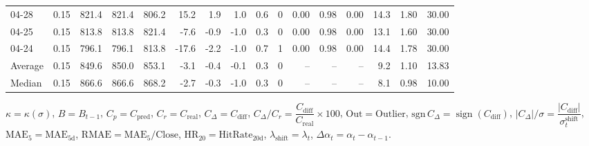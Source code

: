 \begin{threeparttable}
{\begin{tabular}{lrrrrrrrrrrrrrrr}
  04-28 &     0.15 & 821.4 & 821.4 & 806.2 &       15.2 &            1.9 &                      1.0 &                 0.6 &              0 &       0.00 &      0.98 &           0.00 &             14.3 &            1.80 &                  30.00 \\
  04-25 &     0.15 & 813.8 & 813.8 & 821.4 &       -7.6 &           -0.9 &                     -1.0 &                 0.3 &              0 &       0.00 &      0.98 &           0.00 &             13.1 &            1.60 &                  30.00 \\
  04-24 &     0.15 & 796.1 & 796.1 & 813.8 &      -17.6 &           -2.2 &                     -1.0 &                 0.7 &              1 &       0.00 &      0.98 &           0.00 &             14.4 &            1.78 &                  30.00 \\
Average &     0.15 & 849.6 & 850.0 & 853.1 &       -3.1 &           -0.4 &                     -0.1 &                 0.3 &              0 &         -- &        -- &             -- &              9.2 &            1.10 &                  13.83 \\
 Median &     0.15 & 866.6 & 866.6 & 868.2 &       -2.7 &           -0.3 &                     -1.0 &                 0.3 &              0 &         -- &        -- &             -- &              8.1 &            0.98 &                  10.00 \\
\bottomrule
\end{tabular}
}
\begin{tablenotes}\footnotesize
\item $\kappa=\kappa(\sigma)$, $B=B_{t-1}$, $C_p=C_{\text{pred}}$, $C_r=C_{\text{real}}$, $C_\Delta=C_{\text{diff}}$, $C_\Delta/C_r=\dfrac{C_{\text{diff}}}{C_{\text{real}}}\times100$, $\mathrm{Out}=\text{Outlier}$, $\mathrm{sgn}\,C_\Delta=\operatorname{sign}(C_{\text{diff}})$, $|C_\Delta|/\sigma=\dfrac{|C_{\text{diff}}|}{\sigma_t^{\text{shift}}}$, $\mathrm{MAE}_5=\mathrm{MAE}_{5\text{d}}$, $\mathrm{RMAE}= \mathrm{MAE}_5 / \text{Close}$, $\mathrm{HR}_{20}=\mathrm{HitRate}_{20\text{d}}$, 
$\lambda_{\text{shift}}=\lambda_t$, 
$\Delta\alpha_t=\alpha_t-\alpha_{t-1}$.
\end{tablenotes}
\end{threeparttable}
\endgroup

